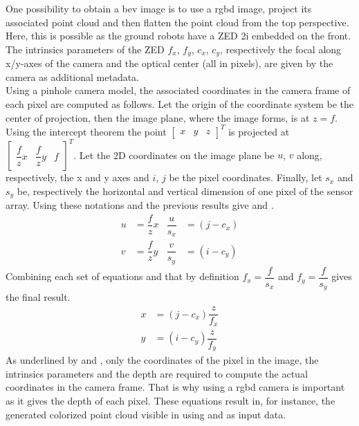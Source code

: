 One possibility to obtain a \gls{bev} image is to use a \gls{rgbd} image, project its associated point cloud and then
flatten the point cloud from the top perspective.
Here, this is possible as the ground robots have a ZED 2i embedded on the front.
The intrinsics parameters of the ZED $f_x$, $f_y$, $c_x$, $c_y$, respectively the focal along x/y-axes of the camera
and the optical center (all in pixels), are given by the camera as additional metadata.\\
Using a pinhole camera model, the associated coordinates in the camera frame of each pixel are computed as follows.
Let the origin of the coordinate system be the center of projection, then the image plane, where the image forms, is at $z = f$.
Using the intercept theorem the point $\begin{bmatrix} %
                                           x & y & z
\end{bmatrix}^T$ is projected at $\begin{bmatrix}
                                      \dfrac{f}{z} x & \dfrac{f}{z} y & f
\end{bmatrix}^T$.
Let the 2D coordinates on the image plane be $u$, $v$ along, respectively, the x and y axes and $i$, $j$ be the pixel
coordinates.
Finally, let $s_x$ and $s_y$ be, respectively the horizontal and vertical dimension of one pixel of the sensor array.
Using these notations and the previous results give  and .
\begin{align}
    u &= \dfrac{f}{z} x & \dfrac{u}{s_x} &= (j - c_x) \label{eq:pcd_rgbd:u} \\
    v &= \dfrac{f}{z} y & \dfrac{v}{s_y} &= (i - c_y) \label{eq:pcd_rgbd:v}
\end{align}
Combining each set of equations and that by definition $f_x = \dfrac{f}{s_x}$ and $f_y = \dfrac{f}{s_y}$ gives the final result.
\begin{align}
    x &= (j - c_x) \dfrac{z}{f_x} \label{eq:pcd_rgbd:x} \\
    y &= (i - c_y) \dfrac{z}{f_y} \label{eq:pcd_rgbd:y}
\end{align}
As underlined by  and , only the coordinates of the pixel in the image, the intrinsics
parameters and the depth are required to compute the actual coordinates in the camera frame.
That is why using a \gls{rgbd} camera is important as it gives the depth of each pixel.
These equations result in, for instance, the generated colorized point cloud visible in  using
 and  as input data.

